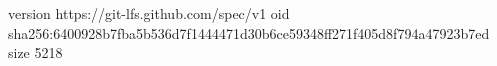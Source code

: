 version https://git-lfs.github.com/spec/v1
oid sha256:6400928b7fba5b536d7f1444471d30b6ce59348ff271f405d8f794a47923b7ed
size 5218
